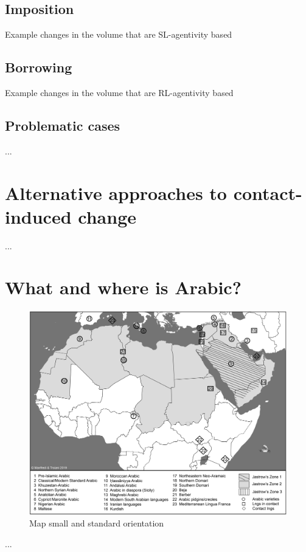\documentclass[output=paper]{langsci/langscibook}
\begin{document}
\subsection{Imposition}
Example changes in the volume that are SL-agentivity based

\subsection{Borrowing}
Example changes in the volume that are RL-agentivity based

\subsection{Problematic cases}
...

\section{Alternative approaches to contact-induced change} 
...

\section{What and where is Arabic?}

\begin{figure}
\includegraphics[width=\textwidth]{figures/Monde_arabe.jpg}
\caption{Map small and standard orientation}
\label{map}
\end{figure}

...
  
\end{document}
